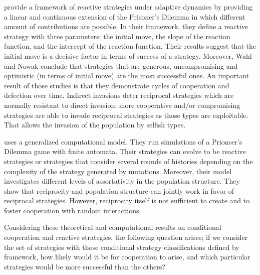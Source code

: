 \documentclass[12pt]{article}
\begin{document}
\citet{Wahl1999-zi,Wahl1999-nn} provide a framework of reactive strategies under adaptive dynamics by providing a linear and continuous extension of the Prisoner's Dilemma in which different amount of contributions are possible. In their framework, they define a reactive strategy with three parameters: the initial move, the slope of the reaction function, and the intercept of the reaction function. Their results suggest that the initial move is a decisive factor in terms of success of a strategy. Moreover, Wahl and Nowak conclude that strategies that are generous, uncompromising and optimistic (in terms of initial move) are the most successful ones. An important result of those studies is  that they demonstrate cycles of cooperation and defection over time. Indirect invasions deter reciprocal strategies which are normally resistant to direct invasion: more cooperative and/or compromising strategies are able to invade reciprocal strategies as those types are exploitable. That allows the invasion of the population by selfish types. 

\citet{Van_Veelen2012-xf} uses a generalized computational model. They run simulations of a Prionser's Dilemma game with finite automata. Their strategies can evolve to be reactive strategies or strategies that consider several rounds of histories depending on the complexity of the strategy generated by mutations. Moreover, their model investigates different levels of assortativity in the population structure. They show that reciprocity and population structure can jointly work in favor of reciprocal strategies. However, reciprocity itself is not sufficient to create and to foster cooperation with random interactions. 

Considering these theoretical and computational results on conditional cooperation and reactive strategies, the following question arises; if we consider the set of strategies with those conditional strategy classifications defined by \citet{Fischbacher2001} framework, how likely would it be for cooperation to arise, and which particular strategies would be more successful than the others?
\end{document}
